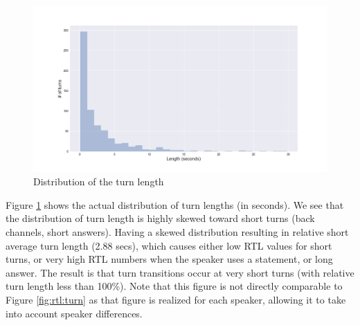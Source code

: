 \begin{figure}[ht!]
\centering
\includegraphics[width=\textwidth]{../scikitlearn/figures/f10.png}\vspace{-1em}
\caption{Distribution of the turn length}
\label{fig:turn_dist}
\end{figure}
%
Figure \ref {fig:turn_dist} shows the actual distribution of turn lengths (in seconds).
We see that the distribution of turn length is highly skewed toward short turns (back channels, short answers). Having a skewed distribution resulting in relative short average turn length (2.88 secs), which causes either low RTL values for short turns, or very high RTL numbers when the speaker uses a statement, or long answer. The result is that turn transitions occur at very short turns (with relative turn length less than 100\%). Note that this figure is not directly comparable to Figure \ref {fig:rtl:turn} as that figure is realized for each speaker, allowing it to take into account speaker differences.




